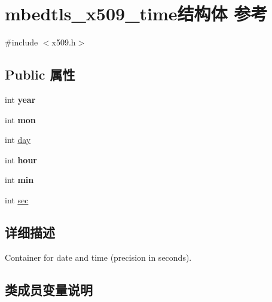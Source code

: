 \hypertarget{structmbedtls__x509__time}{}\section{mbedtls\+\_\+x509\+\_\+time结构体 参考}
\label{structmbedtls__x509__time}


{\ttfamily \#include $<$x509.\+h$>$}

\subsection*{Public 属性}
\begin{DoxyCompactItemize}
\item 
\mbox{\label{structmbedtls__x509__time_a8a7e1d3481392216ebf374174ad9391f}} 
int {\bfseries year}
\item 
\mbox{\label{structmbedtls__x509__time_aea98403aec3bfd6790c308f3a7f36add}} 
int {\bfseries mon}
\item 
int \hyperlink{structmbedtls__x509__time_a20712c77a94123d4610c87d6863cf092}{day}
\item 
\mbox{\label{structmbedtls__x509__time_a163b3884c0b321a1d5cccf85ab79ad76}} 
int {\bfseries hour}
\item 
\mbox{\label{structmbedtls__x509__time_aa4a3bcdc60bbdc3a3bb346ae65c89b65}} 
int {\bfseries min}
\item 
int \hyperlink{structmbedtls__x509__time_a267d51d8fbecde50b06b883db7f98ec2}{sec}
\end{DoxyCompactItemize}


\subsection{详细描述}
Container for date and time (precision in seconds). 

\subsection{类成员变量说明}
\mbox{\label{structmbedtls__x509__time_a20712c77a94123d4610c87d6863cf092}} 
